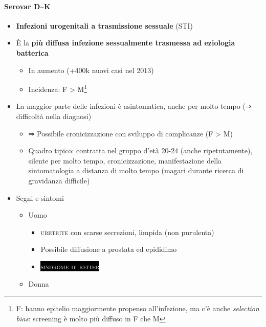 \documentclass[italian,]{article}
\providecommand{\tightlist}{%
  \setlength{\itemsep}{0pt}\setlength{\parskip}{0pt}}
\newcommand{\pat}[1]{\colorbox{black}{\textcolor{white}{\textsc{#1}}}}
\begin{document}
\hypertarget{serovar-dk}{%
\paragraph{Serovar D\textasciitilde{}K}\label{serovar-dk}}

\begin{itemize}
\tightlist
\item
  \textbf{Infezioni urogenitali a trasmissione sessuale} (STI)
\item
  È la \textbf{più diffusa infezione sessualmente trasmessa ad eziologia
  batterica}

  \begin{itemize}
  \tightlist
  \item
    In aumento (+400k nuovi casi nel 2013)
  \item
    Incidenza: F \textgreater{} M\footnote{F: hanno epitelio
      maggiormente propenso all'infezione, ma c'è anche \emph{selection
      bias}: screening è molto più diffuso in F che M}
  \end{itemize}
\item
  La maggior parte delle infezioni è asintomatica, anche per molto tempo
  (⇒ difficoltà nella diagnosi)

  \begin{itemize}
  \tightlist
  \item
    ⇒ Possibile cronicizzazione con sviluppo di complicanze (F
    \textgreater{} M)
  \item
    Quadro tipico: contratta nel gruppo d'età 20-24 (anche
    ripetutamente), silente per molto tempo, cronicizzazione,
    manifestazione della sintomatologia a distanza di molto tempo
    (magari durante ricerca di gravidanza difficile)
  \end{itemize}
\item
  Segni e sintomi

  \begin{itemize}
  \tightlist
  \item
    Uomo

    \begin{itemize}
    \item
      \textsc{uretrite} con scarse secrezioni, limpida (non purulenta)
    \item
      Possibile diffusione a prostata ed epididimo
    \item
      \pat{sindrome di reiter}
    \end{itemize}
  \item
    Donna


\end{itemize}
\end{itemize}
\end{document}
